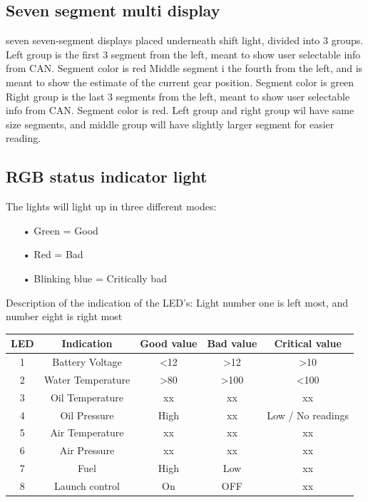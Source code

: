 \subsection*{Seven segment multi display}
seven seven-segment displays placed underneath shift light, divided into 3 groups.\newline
Left group is the first 3 segment from the left, meant to show user selectable info from CAN. Segment color is red\newline
Middle segment i the fourth from the left, and is meant to show the estimate of the current gear position. Segment color is green\newline
Right group is the last 3 segments from the left, meant to show user selectable info from CAN. Segment color is red.\newline
Left group and right group wil have same size segments, and middle group will have slightly larger segment for easier reading.

\subsection*{RGB status indicator light}
The lights will light up in three different modes:

\begin{enumerate}
	\item[•]Green = Good
	\item[•]Red = Bad
	\item[•]Blinking blue = Critically bad
\end{enumerate}
Description of the indication of the LED's:
Light number one is left most, and number eight is right most
\begin{center}
  \begin{tabular}{| c | c | c | c | c |}
    \hline
    LED & Indication & Good value & Bad value & Critical value \\ \hline
    1 & Battery Voltage & <12 & >12 & >10 \\ \hline
    2 & Water Temperature & >80 & >100 & <100  \\ \hline
    3 & Oil Temperature & xx & xx & xx \\ \hline
    4 & Oil Pressure & High & xx & Low / No readings \\ \hline
    5 & Air Temperature & xx & xx & xx \\ \hline
    6 & Air Pressure & xx & xx & xx \\ \hline
    7 & Fuel & High & Low & xx \\ \hline
    8 & Launch control & On & OFF & xx \\ \hline
  \end{tabular}
\end{center}

